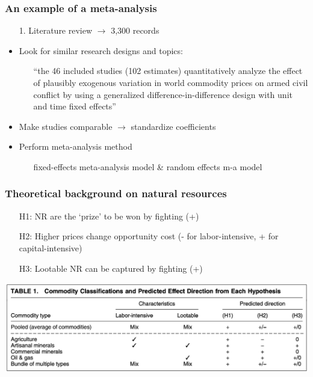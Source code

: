 \documentclass[aspectratio=43]{beamer}
\begin{document}
\begin{frame}
\frametitle{An example of a meta-analysis}
\centering

\begin{itemize}
  \item[1.] Literature review $\rightarrow$ 3,300 records
  \item<2->[2.] Look for similar research designs and topics:
  \begin{itemize}
    \item[] ``the 46 included studies (102 estimates) quantitatively analyze the effect of plausibly exogenous variation in world commodity prices on armed civil conflict by using a generalized difference-in-difference design with unit and time fixed effects''
  \end{itemize}
  \item<3->[3.] Make studies comparable $\rightarrow$ standardize coefficients
  \item<4->[4.] Perform meta-analysis method
  \begin{itemize}
    \item[] fixed-effects meta-analysis model \& random effects m-a model
  \end{itemize}
\end{itemize}

\end{frame}

\begin{frame}
\frametitle{Theoretical background on natural resources}
\centering

\begin{itemize}
  \item[H1:] NR are the `prize' to be won by fighting (+)
  \item[H2:] Higher prices change opportunity cost (- for labor-intensive, + for capital-intensive)
  \item[H3:] Lootable NR can be captured by fighting (+)
\end{itemize}

\includegraphics[width = \textwidth]{../img/blair_apsr2}

\end{frame}
\end{document}
